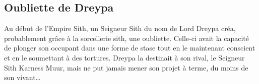 \begin{figure}[!h]
\end{figure}

\twocolumn

\subsection{Oubliette de Dreypa}\label{sec:oubliette-de-dreypa}
Au début de l'Empire Sith, un Seigneur Sith du nom de Lord Dreypa créa, probablement grâce à la sorcellerie sith, une oubliette. Celle-ci avait la capacité de plonger son occupant dans une forme de stase tout en le maintenant conscient et en le soumettant à des tortures. Dreypa la destinait à son rival, le Seigneur Sith Karness Muur, mais ne put jamais mener son projet à terme, du moins de son vivant… 

